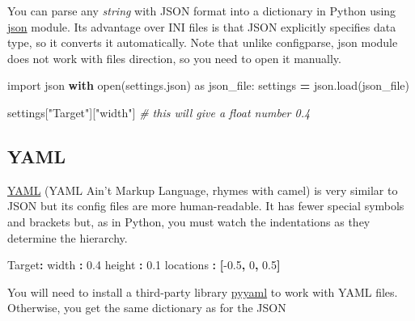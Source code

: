 \documentclass[
]{book}
\newenvironment{Shaded}{\begin{snugshade}}{\end{snugshade}}
\newcommand{\AttributeTok}[1]{\textcolor[rgb]{0.77,0.63,0.00}{#1}}
\newcommand{\BuiltInTok}[1]{#1}
\newcommand{\CommentTok}[1]{\textcolor[rgb]{0.56,0.35,0.01}{\textit{#1}}}
\newcommand{\ControlFlowTok}[1]{\textcolor[rgb]{0.13,0.29,0.53}{\textbf{#1}}}
\newcommand{\DecValTok}[1]{\textcolor[rgb]{0.00,0.00,0.81}{#1}}
\newcommand{\FloatTok}[1]{\textcolor[rgb]{0.00,0.00,0.81}{#1}}
\newcommand{\FunctionTok}[1]{\textcolor[rgb]{0.00,0.00,0.00}{#1}}
\newcommand{\ImportTok}[1]{#1}
\newcommand{\KeywordTok}[1]{\textcolor[rgb]{0.13,0.29,0.53}{\textbf{#1}}}
\newcommand{\NormalTok}[1]{#1}
\newcommand{\OperatorTok}[1]{\textcolor[rgb]{0.81,0.36,0.00}{\textbf{#1}}}
\newcommand{\StringTok}[1]{\textcolor[rgb]{0.31,0.60,0.02}{#1}}
\begin{document}
You can parse any \emph{string} with JSON format into a dictionary in Python using \href{https://docs.python.org/3/library/json.html}{json} module. Its advantage over INI files is that JSON explicitly specifies data type, so it converts it automatically. Note that unlike configparse, json module does not work with files direction, so you need to open it manually.

\begin{Shaded}
\begin{Highlighting}[]
\ImportTok{import}\NormalTok{ json}
\ControlFlowTok{with} \BuiltInTok{open}\NormalTok{(}\StringTok{\textquotesingle{}settings.json\textquotesingle{}}\NormalTok{) }\ImportTok{as}\NormalTok{ json\_file:}
\NormalTok{    settings }\OperatorTok{=}\NormalTok{ json.load(json\_file)}
    
\NormalTok{settings[}\StringTok{"Target"}\NormalTok{][}\StringTok{"width"}\NormalTok{] }\CommentTok{\# this will give a float number 0.4}
\end{Highlighting}
\end{Shaded}

\hypertarget{yaml}{%
\subsection{YAML}\label{yaml}}

\href{https://en.wikipedia.org/wiki/YAML}{YAML} (YAML Ain't Markup Language, rhymes with camel) is very similar to JSON but its config files are more human-readable. It has fewer special symbols and brackets but, as in Python, you must watch the indentations as they determine the hierarchy.

\begin{Shaded}
\begin{Highlighting}[]
\FunctionTok{Target}\KeywordTok{:}
\AttributeTok{  }\FunctionTok{width }\KeywordTok{:}\AttributeTok{ }\FloatTok{0.4}
\AttributeTok{  }\FunctionTok{height }\KeywordTok{:}\AttributeTok{ }\FloatTok{0.1}
\AttributeTok{  }\FunctionTok{locations }\KeywordTok{:}\AttributeTok{ }\KeywordTok{[}\FloatTok{{-}0.5}\KeywordTok{,}\AttributeTok{ }\DecValTok{0}\KeywordTok{,}\AttributeTok{ }\FloatTok{0.5}\KeywordTok{]}
\end{Highlighting}
\end{Shaded}

You will need to install a third-party library \href{https://pyyaml.org/}{pyyaml} to work with YAML files. Otherwise, you get the same dictionary as for the JSON
\end{document}
